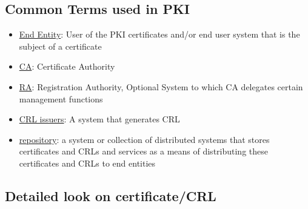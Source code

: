 \documentclass[12pt]{report}
\begin{document}
\subsection{Common Terms used in PKI}
\begin{itemize}
    \item \underline{End Entity}: User of the PKI certificates and/or end user system that is the subject of a certificate
    \item \underline{CA}: Certificate Authority
    \item \underline{RA}: Registration Authority, Optional System to which CA delegates certain management functions
    \item \underline{CRL issuers}: A system that generates CRL
    \item \underline{repository}: a system or collection of distributed systems that stores certificates and CRLs and services as a means of distributing these certificates and CRLs to end entities
\end{itemize}
\subsection{Detailed look on certificate/CRL}
\end{document}

